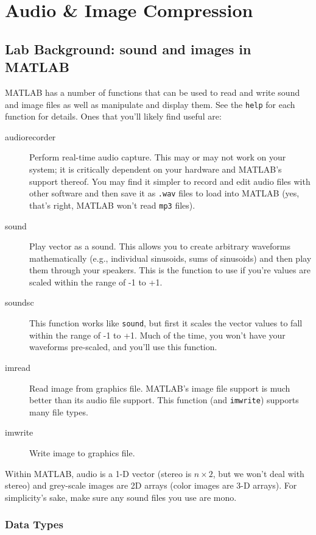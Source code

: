 
\section{Audio \& Image Compression}

\subsection{Lab Background: sound and images in MATLAB}

MATLAB has a number of functions that can be used to read and write
sound and image files as well as manipulate and display them. See the
\texttt{help} for each function for details. Ones that you'll likely
find useful are:
\begin{description}
\item[audiorecorder] Perform real-time audio capture. This may or may
  not work on your system; it is critically dependent on your hardware
  and MATLAB's support thereof. You may find it simpler to record and
  edit audio files with other software and then save it as
  \texttt{.wav} files to load into MATLAB (yes, that's right, MATLAB
  won't read \texttt{mp3} files).
\item[sound] Play vector as a sound. This allows you to create
  arbitrary waveforms mathematically (e.g., individual sinusoids, sums
  of sinusoids) and then play them through your speakers. This is the
  function to use if you're values are scaled within the range of -1
  to +1.
\item[soundsc] This function works like \texttt{sound}, but first it
  scales the vector values to fall within the range of -1 to +1. Much
  of the time, you won't have your waveforms pre-scaled, and you'll
  use this function.
\item[imread] Read image from graphics file. MATLAB's image file
  support is much better than its audio file support. This function
  (and \texttt{imwrite}) supports many file types.
\item[imwrite] Write image to graphics file.
\end{description}

Within MATLAB, audio is a 1-D vector (stereo is $n \times 2$, but we
won't deal with stereo) and grey-scale images are 2D arrays (color
images are 3-D arrays). For simplicity's sake, make sure any sound
files you use are mono.

\subsubsection{Data Types}

